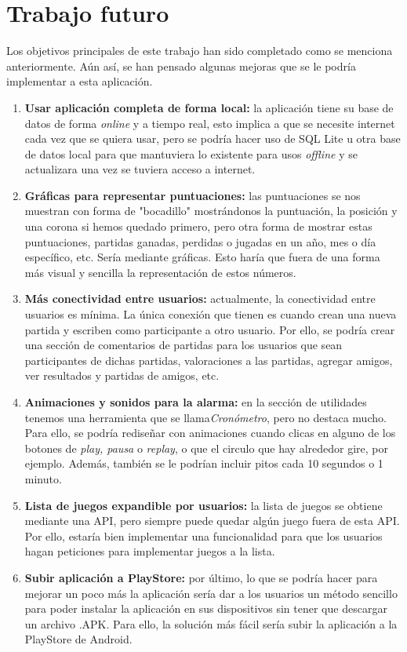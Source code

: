 \chapter{Trabajo futuro}\label{cap:trabajo futuro}

Los objetivos principales de este trabajo han sido completado como se menciona anteriormente. Aún así, se han pensado algunas mejoras que se le podría implementar a esta aplicación.

\begin{enumerate}
    \item \textbf{Usar aplicación completa de forma local:} la aplicación tiene su base de datos de forma \textit{online} y a tiempo real, esto implica a que se necesite internet cada vez que se quiera usar, pero se podría hacer uso de SQL Lite u otra base de datos local para que mantuviera lo existente para usos \textit{offline} y se actualizara una vez se tuviera acceso a internet.
    
    \item \textbf{Gráficas para representar puntuaciones:} las puntuaciones se nos muestran con forma de "bocadillo" mostrándonos la puntuación, la posición y una corona si hemos quedado primero, pero otra forma de mostrar estas puntuaciones, partidas ganadas, perdidas o jugadas en un año, mes o día específico, etc. Sería mediante gráficas. Esto haría que fuera de una forma más visual y sencilla la representación de estos números.
    
    \item \textbf{Más conectividad entre usuarios:} actualmente, la conectividad entre usuarios es mínima. La única conexión que tienen es cuando crean una nueva partida y escriben como participante a otro usuario. Por ello, se podría crear una sección de comentarios de partidas para los usuarios que sean participantes de dichas partidas, valoraciones a las partidas, agregar amigos, ver resultados y partidas de amigos, etc.
    
    \item \textbf{Animaciones y sonidos para la alarma:} en la sección de utilidades tenemos una herramienta que se llama\textit{Cronómetro}, pero no destaca mucho. Para ello, se podría rediseñar con animaciones cuando clicas en alguno de los botones de \textit{play, pausa} o \textit{replay}, o que el circulo que hay alrededor gire, por ejemplo. Además, también se le podrían incluir pitos cada 10 segundos o 1 minuto.
    
    \item \textbf{Lista de juegos expandible por usuarios:} la lista de juegos se obtiene mediante una API, pero siempre puede quedar algún juego fuera de esta API. Por ello, estaría bien implementar una funcionalidad para que los usuarios hagan peticiones para implementar juegos a la lista.
    
    \item \textbf{Subir aplicación a PlayStore:} por último, lo que se podría hacer para mejorar un poco más la aplicación sería dar a los usuarios un método sencillo para poder instalar la aplicación en sus dispositivos sin tener que descargar un archivo .APK. Para ello, la solución más fácil sería subir la aplicación a la PlayStore de Android.
\end{enumerate}